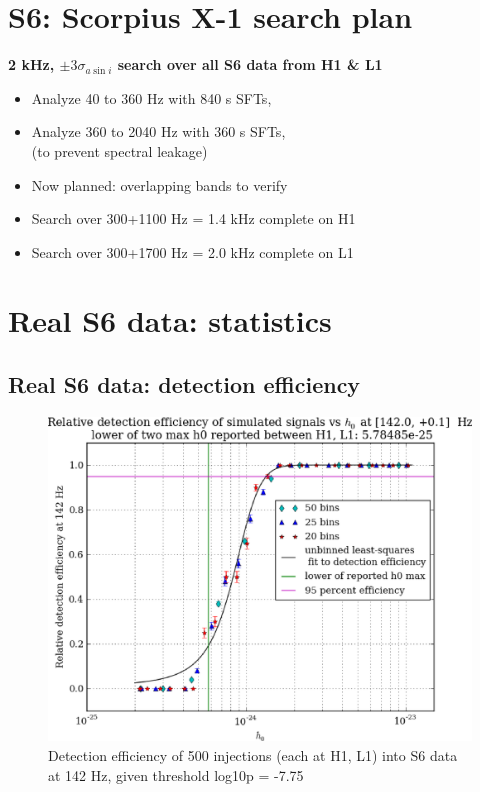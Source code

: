 \section{S6: Scorpius X-1 search plan}

\textbf{2 kHz, $\pm 3 \sigma_{a \sin i}$ search over all S6 data from H1 \& L1}
\begin{itemize}
\item Analyze 40 to 360 Hz with 840 s SFTs,
\item Analyze 360 to 2040 Hz with 360 s SFTs,\\
(to prevent spectral leakage)
\item Now planned: overlapping bands to verify
\item Search over 300+1100 Hz = 1.4 kHz complete on H1
\item Search over 300+1700 Hz = 2.0 kHz complete on L1
\end{itemize}

\section{Real S6 data: statistics}
\subsection{Real S6 data: detection efficiency}

\begin{figure}
\begin{center}
\includegraphics[width=0.4\paperwidth,height=0.2\paperheight]{plots/detectionEfficiencyh0-142-0Hz.eps}
\caption{Detection efficiency of 500 injections (each at H1, L1) into
S6 data at 142 Hz, given threshold log10p = -7.75}
\end{center}
\end{figure}

